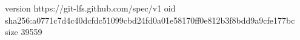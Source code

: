version https://git-lfs.github.com/spec/v1
oid sha256:a0771c7d4c40dcfdc51099cbd24fd0a01e58170ff0e812b3f8bdd9a9cfe177bc
size 39559
